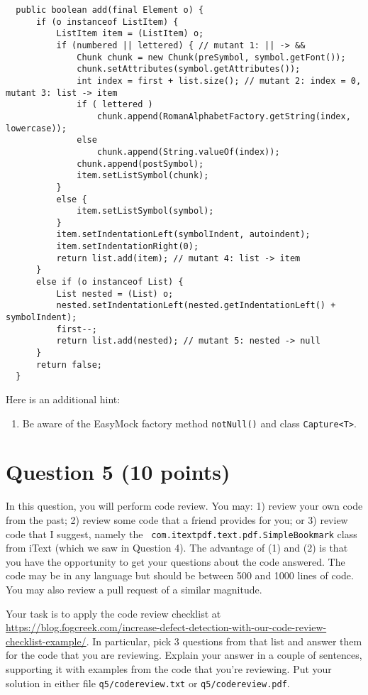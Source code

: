 \documentclass[10pt,hidelinks]{article}
\begin{document}
{\scriptsize
\begin{lstlisting}
  public boolean add(final Element o) {
      if (o instanceof ListItem) {
          ListItem item = (ListItem) o;
          if (numbered || lettered) { // mutant 1: || -> &&
              Chunk chunk = new Chunk(preSymbol, symbol.getFont());
              chunk.setAttributes(symbol.getAttributes());
              int index = first + list.size(); // mutant 2: index = 0, mutant 3: list -> item
              if ( lettered )
                  chunk.append(RomanAlphabetFactory.getString(index, lowercase));
              else
                  chunk.append(String.valueOf(index));
              chunk.append(postSymbol);
              item.setListSymbol(chunk);
          }
          else {
              item.setListSymbol(symbol);
          }
          item.setIndentationLeft(symbolIndent, autoindent);
          item.setIndentationRight(0);
          return list.add(item); // mutant 4: list -> item
      }
      else if (o instanceof List) {
          List nested = (List) o;
          nested.setIndentationLeft(nested.getIndentationLeft() + symbolIndent);
          first--;
          return list.add(nested); // mutant 5: nested -> null
      }
      return false;
  }
\end{lstlisting}
}

\vspace*{1em}\noindent
Here is an additional hint:

\begin{enumerate}
\item Be aware of the EasyMock factory method \verb+notNull()+ and class \verb+Capture<T>+.
\end{enumerate}

\section*{Question 5 (10 points)}
In this question, you will perform code review. You may: 1) review
your own code from the past; 2) review some code that a friend
provides for you; or 3) review code that I suggest, namely the {\tt
  com.itextpdf.text.pdf.SimpleBookmark} class from iText (which we saw
in Question 4). The advantage of (1) and (2) is that you have the
opportunity to get your questions about the code answered. The code
may be in any language but should be between 500 and 1000 lines of
code. You may also review a pull request of a similar magnitude.

Your task is to apply the code review checklist at
\url{https://blog.fogcreek.com/increase-defect-detection-with-our-code-review-checklist-example/}. In
particular, pick 3 questions from that list and answer them for the
code that you are reviewing. Explain your answer in a couple of
sentences, supporting it with examples from the code that you're
reviewing. Put your solution in either file {\tt q5/codereview.txt}
or {\tt q5/codereview.pdf}. 



\end{document}
